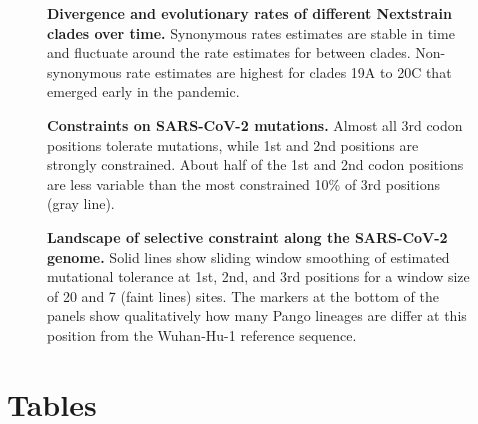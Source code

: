 \documentclass[aps,rmp, twocolumn]{revtex4}
\begin{document}
\begin{figure}
    \caption{{\bf Divergence and evolutionary rates of different Nextstrain clades over time.} Synonymous rates estimates are stable in time and fluctuate around the rate estimates for between clades. Non-synonymous rate estimates are highest for clades 19A to 20C that emerged early in the pandemic.
    \label{fig:rate_progression} }
\end{figure}


\begin{figure}
    \caption{{\bf Constraints on SARS-CoV-2 mutations.}
    Almost all 3rd codon positions tolerate mutations, while 1st and 2nd positions are strongly constrained.
    About half of the 1st and 2nd codon positions are less variable than the most constrained 10\% of 3rd positions (gray line).
    \label{fig:fitness_costs}}
\end{figure}

\begin{figure*}[tb]
    \caption{{\bf Landscape of selective constraint along the SARS-CoV-2 genome.}
    Solid lines show sliding window smoothing of estimated mutational tolerance at 1st, 2nd, and 3rd positions for a window size of 20 and 7 (faint lines) sites.
    The markers at the bottom of the panels show qualitatively how many Pango lineages are differ at this position from the Wuhan-Hu-1 reference sequence.
    \label{fig:fitness_landscape}}
\end{figure*}

\clearpage
\section*{Tables}
\end{document}
